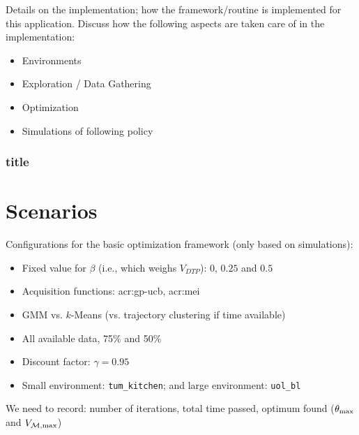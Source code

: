 Details on the implementation; how the framework/routine is implemented for this application. Discuss how the following aspects are taken care of in the implementation:
\begin{itemize}
	\item Environments
	\item Exploration / Data Gathering
	\item Optimization
	\item Simulations of following policy
\end{itemize}

\subsubsection{title}

\section{Scenarios}
\label{sec:scenarios}


\noindent Configurations for the basic optimization framework (only based on simulations):
\begin{itemize}
	\item Fixed value for $\beta$ (i.e., which weighs $V_\mathit{DTP}$): $0$, $0.25$ and $0.5$
	\item Acquisition functions: \acrshort{acr:gp-ucb}, \acrshort{acr:mei}
	\item GMM vs. $k$-Means (vs. trajectory clustering if time available)
	\item All available data, 75\% and 50\%
	\item Discount factor: $\gamma = 0.95$
	\item Small environment: \texttt{tum\_kitchen}; and large environment: \texttt{uol\_bl}
\end{itemize}
We need to record: number of iterations, total time passed, optimum found ($\theta_\textnormal{max}$ and $V_{\mathcal{M},\textnormal{max}}$)

